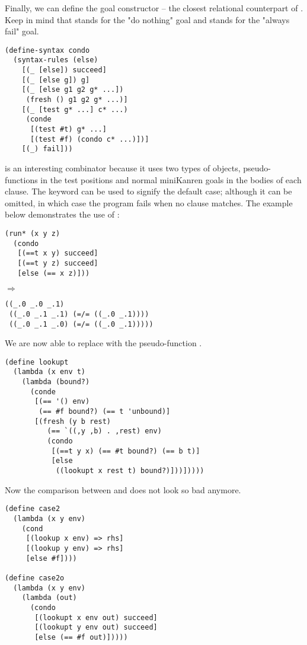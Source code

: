 Finally, we can define the goal constructor  -- the closest relational counterpart of . Keep in mind that  stands for the "do nothing" goal and  stands for the "always fail" goal.
\begin{lstlisting}
(define-syntax condo
  (syntax-rules (else)
    [(_ [else]) succeed]
    [(_ [else g]) g]
    [(_ [else g1 g2 g* ...])
     (fresh () g1 g2 g* ...)]
    [(_ [test g* ...] c* ...)
     (conde
      [(test #t) g* ...]
      [(test #f) (condo c* ...)])]
    [(_) fail]))
\end{lstlisting}
 is an interesting combinator because it uses two types of objects, pseudo-functions in the test positions and normal miniKanren goals in the bodies of each clause. The  keyword can be used to signify the default case; although it can be omitted, in which case the program fails when no clause matches. The example below demonstrates the use of :
\begin{lstlisting}
(run* (x y z)
  (condo
   [(==t x y) succeed]
   [(==t y z) succeed]
   [else (== x z)]))
\end{lstlisting}
$\Rightarrow$
\begin{lstlisting}
((_.0 _.0 _.1)
 ((_.0 _.1 _.1) (=/= ((_.0 _.1))))
 ((_.0 _.1 _.0) (=/= ((_.0 _.1)))))
\end{lstlisting}

We are now able to replace  with the pseudo-function .
\begin{lstlisting}
(define lookupt
  (lambda (x env t)
    (lambda (bound?)
      (conde
       [(== '() env)
        (== #f bound?) (== t 'unbound)]
       [(fresh (y b rest)
          (== `((,y ,b) . ,rest) env)
          (condo
           [(==t y x) (== #t bound?) (== b t)]
           [else
            ((lookupt x rest t) bound?)]))]))))
\end{lstlisting}
Now the comparison between  and  does not look so bad anymore.
\begin{lstlisting}
(define case2
  (lambda (x y env)
    (cond
     [(lookup x env) => rhs]
     [(lookup y env) => rhs]
     [else #f])))

(define case2o
  (lambda (x y env)
    (lambda (out)
      (condo
       [(lookupt x env out) succeed]
       [(lookupt y env out) succeed]
       [else (== #f out)]))))
\end{lstlisting}

